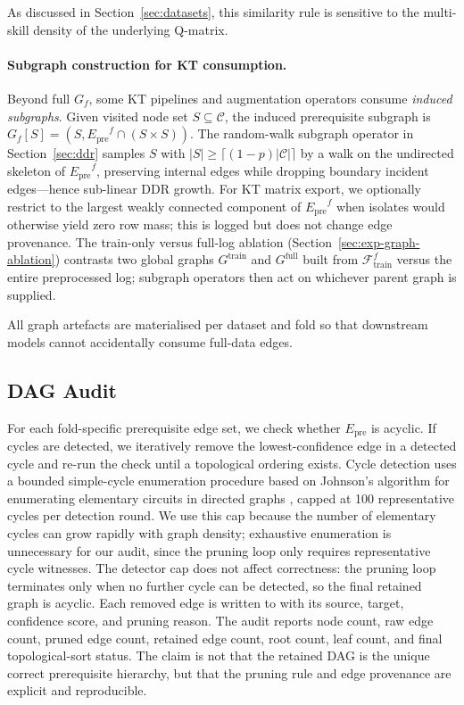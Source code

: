 \documentclass[runningheads]{llncs}
\newcommand{\Epre}{\ensuremath{E_{\text{pre}}}}
\newcommand{\DDR}{\textsc{DDR}}
\begin{document}
As discussed in Section~\ref{sec:datasets}, this similarity rule is
sensitive to the multi-skill density of the underlying Q-matrix.

\paragraph{Subgraph construction for KT consumption.}
\label{sec:subgraph}
Beyond full $G_f$, some KT pipelines and augmentation operators consume
\emph{induced subgraphs}. Given visited node set $S\subseteq\mathcal{C}$,
the induced prerequisite subgraph is
$G_f[S]=(S,\Epre^f\cap(S\times S))$.
The random-walk subgraph operator in Section~\ref{sec:ddr} samples $S$
with $|S|\ge\lceil(1-p)|\mathcal{C}|\rceil$ by a walk on the undirected
skeleton of $\Epre^f$, preserving internal edges while dropping boundary
incident edges---hence sub-linear \DDR{} growth.
For KT matrix export, we optionally restrict to the largest weakly
connected component of $\Epre^f$ when isolates would otherwise yield zero
row mass; this is logged but does not change edge provenance.
The train-only versus full-log ablation (Section~\ref{sec:exp-graph-ablation})
contrasts two global graphs $G^{\text{train}}$ and $G^{\text{full}}$ built
from $\mathcal{F}_{\text{train}}^f$ versus the entire preprocessed log;
subgraph operators then act on whichever parent graph is supplied.

All graph artefacts are materialised per dataset and fold so that
downstream models cannot accidentally consume full-data edges.
\subsection{DAG Audit}
\label{sec:dag-audit}
For each fold-specific prerequisite edge set, we check whether $\Epre$
is acyclic. If cycles are detected, we iteratively remove the
lowest-confidence edge in a detected cycle and re-run the check until a
topological ordering exists. Cycle detection uses a bounded simple-cycle enumeration procedure based on
Johnson's algorithm for enumerating elementary circuits in directed graphs \cite{johnson1975finding}, capped at 100 representative cycles per detection round. We use this cap because the number of elementary cycles can grow rapidly with graph density; exhaustive enumeration is unnecessary for our
audit, since the pruning loop only requires representative cycle witnesses. The detector cap does not affect
correctness: the pruning loop terminates only when no further cycle can
be detected, so the final retained graph is acyclic. Each removed edge
is written to
 with its source,
target, confidence score, and pruning reason. The audit reports node
count, raw edge count, pruned edge count, retained edge count, root
count, leaf count, and final topological-sort status. The claim is not
that the retained DAG is the unique correct prerequisite hierarchy, but
that the pruning rule and edge provenance are explicit and reproducible.
\end{document}
